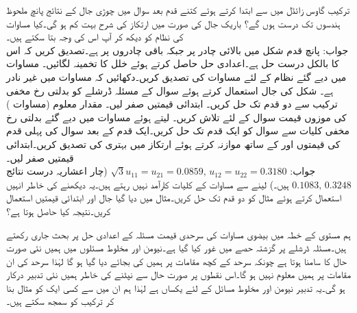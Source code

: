 \quad
ترکیب گاوس زائڈل میں  سے ابتدا کرتے ہوئے کتنے قدم بعد سوال  میں چوڑی جال کے نتائج پانچ ملحوظ ہندسوں تک درست ہوں گے؟ باریک جال کی صورت میں ارتکاز کی شرح بہت کم ہو گی۔کیا مساوات کی نظام کو دیکھ کر آپ اس کی وجہ بتا سکتے ہیں۔\\
جواب:\quad
پانچ قدم
شکل  میں بالائی چادر پر  جبکہ باقی چادروں پر  ہے۔تصدیق کریں کہ اس کا بالکل درست حل  ہے۔اعدادی حل حاصل کرتے ہوئے خلل کا تخمینہ لگائیں۔
\quad 
مساوات  میں دیے گئے نظام کے لئے مساوات  کی تصدیق کریں۔دکھائیں کہ مساوات  میں  غیر نادر ہے۔ 
\quad
شکل  کی جال استعمال کرتے ہوئے سوال  کے مسئلہ ڈرشلے  کو بدلتی رخ مخفی ترکیب سے دو قدم تک حل کریں۔  ابتدائی قیمتیں صفر لیں۔
\quad
مقدار معلوم  (مساوات ) کی موزوں قیمت  سوال  کے لئے تلاش کریں۔ لیتے ہوئے مساوات  میں دیے گئے بدلتی رخ مخفی کلیات سے سوال   کو ایک قدم تک حل کریں۔ایک قدم کے بعد سوال  کی پہلی قدم کی قیمتوں  اور  کے ساتھ موازنہ کرتے ہوئے ارتکاز میں بہتری کی تصدیق کریں۔ابتدائی قیمتیں صفر لیں۔\\
جواب:\quad
$\sqrt{3}u_{11}=u_{21}=0.0859,\, u_{12}=u_{22}=0.3180$
(چار اعشاریہ درست نتائج 
$0.1083,\,0.3248$
ہیں۔) 
\quad
{} لینے سے مساوات  کے کلیات کارآمد نہیں رہتے ہیں۔یہ دیکھنے کی خاطر انہیں استعمال کرتے ہوئے مثال  کو دو قدم تک حل کریں۔مثال میں دیا گیا جال اور ابتدائی قیمتیں استعمال کریں۔نتیجہ کیا حاصل ہوتا ہے؟

ہم  مستوی کے خطہ  میں بیضوی مساوات کی سرحدی قیمت مسئلہ کے اعدادی حل پر بحث جاری رکھتے ہیں۔مسئلہ ڈرشلے پر گزشتہ حصے میں غور کیا گیا ہے۔نیومن اور مخلوط مسئلوں میں ہمیں نئی صورت حال کا سامنا ہوتا ہے چونکہ سرحد کے کچھ مقامات پر ہمیں  کی بجائے   دیا گیا ہو گا لہٰذا سرحد کی ان مقامات پر ہمیں  معلوم نہیں ہو گا۔اس نقطوں پر صورت حال سے نپٹنے کی خاطر ہمیں نئی تدبیر درکار ہو گی۔یہ تدبیر نیومن اور مخلوط مسائل کے لئے یکساں ہے لہٰذا ہم ان میں سے کسی ایک کو مثال بنا کر ترکیب کو سمجھ سکتے ہیں۔

